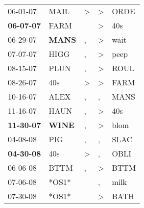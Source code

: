 \begin{supertabular}{p{0.07\textwidth}p{0.06\textwidth}p{0.02\textwidth}p{0.02\textwidth}p{0.06\textwidth}}
          06-01-07\textsuperscript{} &           MAIL\textsuperscript{} &     \textgreater &     \textgreater &           ORDE\textsuperscript{} \\
 \textbf{06-07-07\textsuperscript{}} &           FARM\textsuperscript{} &                  &     \textgreater &            40s\textsuperscript{} \\
          06-29-07\textsuperscript{} &  \textbf{MANS\textsuperscript{}} &                , &     \textgreater &           wait\textsuperscript{} \\
          07-07-07\textsuperscript{} &           HIGG\textsuperscript{} &                , &     \textgreater &           peep\textsuperscript{} \\
          08-15-07\textsuperscript{} &           PLUN\textsuperscript{} &                , &     \textgreater &           ROUL\textsuperscript{} \\
          08-26-07\textsuperscript{} &            40s\textsuperscript{} &     \textgreater &     \textgreater &           FARM\textsuperscript{} \\
          10-16-07\textsuperscript{} &           ALEX\textsuperscript{} &                , &                , &           MANS\textsuperscript{} \\
          11-16-07\textsuperscript{} &           HAUN\textsuperscript{} &                , &     \textgreater &            40s\textsuperscript{} \\
 \textbf{11-30-07\textsuperscript{}} &  \textbf{WINE\textsuperscript{}} &                , &     \textgreater &           blom\textsuperscript{} \\
          04-08-08\textsuperscript{} &            PIG\textsuperscript{} &                , &                , &           SLAC\textsuperscript{} \\
 \textbf{04-30-08\textsuperscript{}} &            40s\textsuperscript{} &     \textgreater &                , &           OBLI\textsuperscript{} \\
          06-06-08\textsuperscript{} &           BTTM\textsuperscript{} &                , &     \textgreater &           BTTM\textsuperscript{} \\
          07-06-08\textsuperscript{} &                            *OS1* &                  &                , &           milk\textsuperscript{} \\
          07-30-08\textsuperscript{} &                            *OS1* &                  &     \textgreater &           BATH\textsuperscript{} \\

\end{supertabular}
